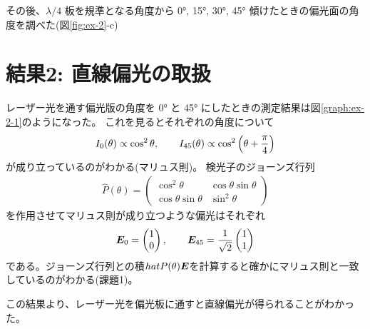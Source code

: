 \documentclass[9pt,dvipdfmx,a4paper]{jsarticle}
\begin{document}
その後、\(\lambda/4\) 板を規準となる角度から \ang{0}, \ang{15}, \ang{30}, \ang{45}
傾けたときの偏光面の角度を調べた(図\ref{fig:ex-2}-c)

\section{結果2: 直線偏光の取扱}
レーザー光を通す偏光版の角度を \ang{0} と \ang{45} にしたときの測定結果は図\ref{graph:ex-2-1}のようになった。
これを見るとそれぞれの角度について
\begin{align}
    I_0(\theta) \propto \cos^2\theta,\qquad I_{45}(\theta) \propto \cos^2\qty(\theta + \frac{\pi}{4})
\end{align}
が成り立っているのがわかる(マリュス則)。
検光子のジョーンズ行列
\begin{align}
    \hat{P}(\theta) =
    \begin{pmatrix}
        \cos^2\theta & \cos\theta\sin\theta\\
        \cos\theta\sin\theta & \sin^2\theta
    \end{pmatrix}
\end{align}
を作用させてマリュス則が成り立つような偏光はそれぞれ
\begin{align}
    \vb*{E}_0 = \begin{pmatrix}
        1 \\ 0
    \end{pmatrix},\qquad
    \vb*{E}_{45} = \frac{1}{\sqrt{2}}\begin{pmatrix}
        1 \\ 1
    \end{pmatrix}
\end{align}
である。ジョーンズ行列との積\(\\hat{P}(\theta)\vb*{E}\)を計算すると確かにマリュス則と一致しているのがわかる(課題1)。

この結果より、レーザー光を偏光板に通すと直線偏光が得られることがわかった。
\end{document}
